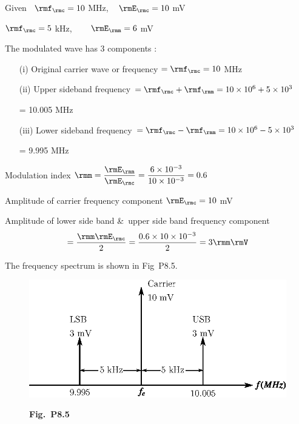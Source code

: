 \begin{solution}
Given ~$\rmf_\rmc =10$ MHz, ~ $\rmE_\rmc = 10$ mV

\smallskip
\hspace{2.1cm} $\rmf_\rmc = 5$ kHz, ~~~\; $\rmE_\rmm = 6$ mV

The modulated wave has 3 components :
\begin{itemize}
\item[(i)] Original carrier wave or frequency $= \rmf_\rmc = 10$ MHz
 
\item[(ii)] Upper sideband frequency $= \rmf_\rmc + \rmf_\rmm = 10 \times 10^6 +
5 \times 10^3$

\hspace{4.1cm} = 10.005 MHz

\item[(iii)] Lower sideband frequency $= \rmf_\rmc - \rmf_\rmm = 10 \times 10^6 -
5 \times 10^3$

\hspace{4.1cm} = 9.995 MHz
\end{itemize}

Modulation index $\rmm = \dfrac{\rmE_\rmm}{\rmE_\rmc} = \dfrac{6 \times
10^{-3}}{10 \times 10^{-3}} = 0.6$

\smallskip
Amplitude of carrier frequency component $\rmE_\rmc = 10$ mV

\smallskip
Amplitude of lower side band \&\ upper side band frequency component 
$$
= \frac{\rmm\rmE_\rmc}{2} = \frac{0.6 \times 10 \times 10^{-3}}{2} = 3 \rmm\rmV
$$

The frequency spectrum is shown in Fig~P8.5.
\begin{figure}[H]
\centering
\includegraphics{chap8/fig8.5.eps}

\smallskip
{\bf Fig.~P8.5}
\end{figure}
\end{solution}

